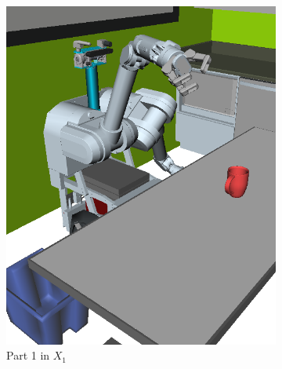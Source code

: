 {\begin{figure}[t]
\begin{widepage}
\begin{center}
\begin{subfigure}[t]{0.19\linewidth}
\includegraphics[width=\columnwidth]{figs/testherb-b.png}
\caption{Part 1 in $X_1$}
\end{subfigure}
\begin{subfigure}[t]{0.19\linewidth}
\centering

\end{subfigure}
\end{center}
\end{widepage}
\end{figure}}
